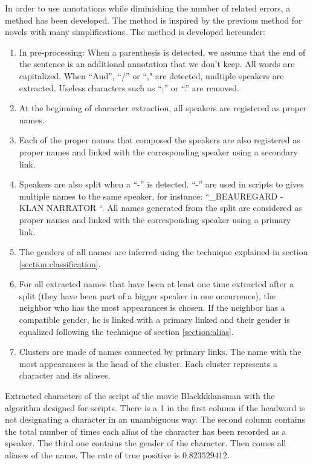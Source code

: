 \documentclass[a4paper, 12pt]{report}
\begin{document}
In order to use annotations while diminishing the number of related errors, a method has been developed.
The method is inspired by the previous method for novels with many simplifications. The method is developed hereunder:
\begin{enumerate}
\item In pre-processing: When a parenthesis is detected, we assume that the end of the sentence is an additional annotation that we don't keep. All words are capitalized. When ``And'', ``/'' or ``," are detected, multiple speakers are extracted. Useless characters such as ``;'' or ``.'' are removed.
\item At the beginning of character extraction, all speakers are registered as proper names.
\item Each of the proper names that composed the speakers are also registered as proper names and linked with the corresponding speaker using a secondary link.
\item Speakers are also split when a ``-'' is detected. ``-'' are used in scripts to gives multiple names to the same speaker, for instance: ``_BEAUREGARD - KLAN NARRATOR ``.
All names generated from the split are considered as proper names and linked with the corresponding speaker using a primary link.
\item The genders of all names are inferred using the technique explained in section \ref{section:classification}.
\item For all extracted names that have been at least one time extracted after a split (they have been part of a bigger speaker in one occurrence), the neighbor who has the most appearances is chosen. If the neighbor has a compatible gender, he is linked with a primary linked and their gender is equalized following the technique of section \ref{section:alias}.
\item Clusters are made of names connected by primary links. The name with the most appearances is the head of the cluster. Each cluster represents a character and its aliases.
\end{enumerate}


\begin{table}[]
\caption{Extracted characters of the script of the movie Blackkklansman with the algorithm designed for scripts.
There is a 1 in the first column if the headword is not designating a character in an unambiguous way.
The second column contains the total number of times each alias of the character has been recorded as a speaker.
The third one contains the gender of the character. Then comes all aliases of the name. The rate of true positive is $0.823529412$.}
\label{character_bkm}
\end{table}
\end{document}
